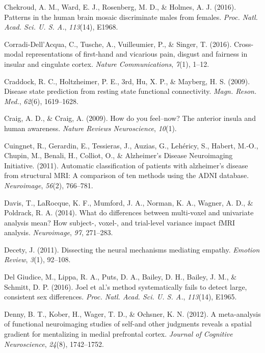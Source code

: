 \documentclass[12pt,american,a4paper,oneside,]{memoir} %
\begin{document}
\leavevmode\hypertarget{ref-Chekroud2016-tc}{}%
Chekroud, A. M., Ward, E. J., Rosenberg, M. D., \& Holmes, A. J. (2016). Patterns in the human brain mosaic discriminate males from females. \emph{Proc. Natl. Acad. Sci. U. S. A.}, \emph{113}(14), E1968.

\leavevmode\hypertarget{ref-corradi2016cross}{}%
Corradi-Dell'Acqua, C., Tusche, A., Vuilleumier, P., \& Singer, T. (2016). Cross-modal representations of first-hand and vicarious pain, disgust and fairness in insular and cingulate cortex. \emph{Nature Communications}, \emph{7}(1), 1--12.

\leavevmode\hypertarget{ref-Craddock2009-kz}{}%
Craddock, R. C., Holtzheimer, P. E., 3rd, Hu, X. P., \& Mayberg, H. S. (2009). Disease state prediction from resting state functional connectivity. \emph{Magn. Reson. Med.}, \emph{62}(6), 1619--1628.

\leavevmode\hypertarget{ref-craig2009you}{}%
Craig, A. D., \& Craig, A. (2009). How do you feel--now? The anterior insula and human awareness. \emph{Nature Reviews Neuroscience}, \emph{10}(1).

\leavevmode\hypertarget{ref-Cuingnet2011-hv}{}%
Cuingnet, R., Gerardin, E., Tessieras, J., Auzias, G., Lehéricy, S., Habert, M.-O., Chupin, M., Benali, H., Colliot, O., \& Alzheimer's Disease Neuroimaging Initiative. (2011). Automatic classification of patients with alzheimer's disease from structural MRI: A comparison of ten methods using the ADNI database. \emph{Neuroimage}, \emph{56}(2), 766--781.

\leavevmode\hypertarget{ref-Davis2014-lw}{}%
Davis, T., LaRocque, K. F., Mumford, J. A., Norman, K. A., Wagner, A. D., \& Poldrack, R. A. (2014). What do differences between multi-voxel and univariate analysis mean? How subject-, voxel-, and trial-level variance impact fMRI analysis. \emph{Neuroimage}, \emph{97}, 271--283.

\leavevmode\hypertarget{ref-decety2011dissecting}{}%
Decety, J. (2011). Dissecting the neural mechanisms mediating empathy. \emph{Emotion Review}, \emph{3}(1), 92--108.

\leavevmode\hypertarget{ref-Del_Giudice2016-ns}{}%
Del Giudice, M., Lippa, R. A., Puts, D. A., Bailey, D. H., Bailey, J. M., \& Schmitt, D. P. (2016). Joel et al.'s method systematically fails to detect large, consistent sex differences. \emph{Proc. Natl. Acad. Sci. U. S. A.}, \emph{113}(14), E1965.

\leavevmode\hypertarget{ref-denny2012meta}{}%
Denny, B. T., Kober, H., Wager, T. D., \& Ochsner, K. N. (2012). A meta-analysis of functional neuroimaging studies of self-and other judgments reveals a spatial gradient for mentalizing in medial prefrontal cortex. \emph{Journal of Cognitive Neuroscience}, \emph{24}(8), 1742--1752.
\end{document}
